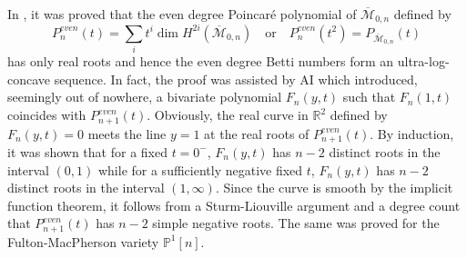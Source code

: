 \documentclass[11pt]{amsart}
\newcommand{\Mbarzn}{\overline{\mathcal M}_{0,n}}
\newcommand{\RR}{\mathbb R}
\newcommand{\PP}{\mathbb{P}}
\newcommand{\cM}{\mathcal{M}}
\newcommand{\bcM}{\overline{\cM}}
\def\cM{\mathcal{M}}
\def\beq{\begin{equation}}
\def\eeq{\end{equation}}
\begin{document}
In \cite{BercziKiem2026}, it was proved that the even degree Poincar\'e polynomial of $\Mbarzn$ defined by 
\beq\label{i7}
P^{even}_{n}(t)=\sum_it^i\dim H^{2i}(\bcM_{0,n})\quad \text{or}\quad P^{even}_{n}(t^2)=P_{\Mbarzn}(t)\eeq 
has only real roots and hence the even degree Betti numbers form an ultra-log-concave sequence. In fact, the proof was assisted by AI which introduced, seemingly out of nowhere, a bivariate polynomial $F_n(y,t)$ such that $F_n(1,t)$ coincides with $P^{even}_{n+1}(t)$.
Obviously, the real curve in $\RR^2$ defined by $F_n(y,t)=0$ meets the line $y=1$ at the real roots of $P^{even}_{n+1}(t)$. By induction, it was shown that for a fixed $t=0^-$, $F_n(y,t)$ has $n-2$ distinct roots in the interval $(0,1)$ while for a sufficiently negative fixed $t$, $F_n(y,t)$ has $n-2$ distinct roots in the interval $(1,\infty)$. Since the curve is smooth by the implicit function theorem, it follows from a Sturm-Liouville argument and a degree count that $P^{even}_{n+1}(t)$ has $n-2$ simple negative roots. The same was proved for the Fulton-MacPherson variety $\PP^1[n]$. 

\begin{center}
\end{center}
\medskip
\end{document}
